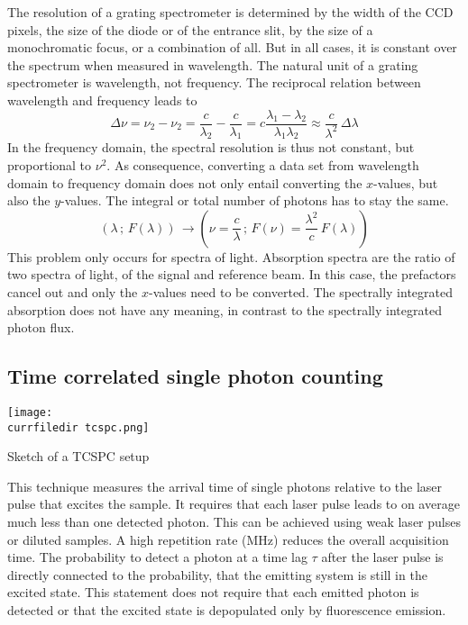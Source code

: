 The resolution of a grating spectrometer is determined by the width of the CCD pixels, the size of the diode or of the entrance slit, by the size of a monochromatic focus, or a combination of all. But in all cases, it is constant over the spectrum when measured in wavelength. The natural unit of a grating spectrometer is wavelength, not frequency. The reciprocal relation between wavelength and frequency leads to 
\begin{equation}
 \Delta \nu = \nu_2 - \nu_2 = \frac{c}{\lambda_2} - \frac{c}{\lambda_1}  = c \frac{\lambda_1 - \lambda_2}{\lambda_1 \lambda_2} \approx \frac{c}{\lambda^2} \, \Delta \lambda
\end{equation}
In the frequency domain, the spectral resolution is thus not constant, but proportional to $\nu^2$. As consequence, converting a data set from wavelength domain to frequency domain does not only entail converting the $x$-values, but also the $y$-values. The integral or total number of photons has to stay the same.
\begin{equation}
 \left( \lambda \, ; \, F(\lambda) \right) \, \rightarrow  \left( \nu = \frac{c}{ \lambda} \, ; \,  F(\nu) = \frac{\lambda^2}{ c } \, F(\lambda) \right) 
\end{equation}
This problem only occurs for spectra of light. Absorption spectra are the ratio of two spectra of light, of the signal and reference beam. In this case, the prefactors cancel out and only the $x$-values need to be converted. The spectrally integrated absorption does not have any meaning, in contrast to the spectrally integrated photon flux.



\subsection{Time correlated single photon counting}

\begin{marginfigure}
   \texttt{[image: \\currfiledir tcspc.png]}
  \caption{Sketch of a TCSPC setup}
\end{marginfigure}

This technique measures the arrival time of single photons relative to the laser pulse that excites the sample. It requires that each laser pulse leads to on average much less than one detected photon. This can be achieved using weak laser pulses or diluted samples. A high repetition rate (MHz) reduces the overall acquisition time. The probability to detect a photon at a time lag $\tau$ after the laser pulse is directly connected to the probability, that the emitting system is still in the excited state. This statement does not require that each emitted photon is detected or that the excited state is depopulated only by fluorescence emission.





